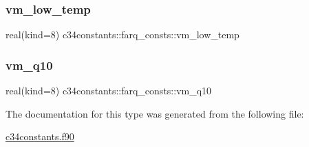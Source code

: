 \subsubsection{\texorpdfstring{vm\+\_\+low\+\_\+temp}{vm\_low\_temp}}
{\footnotesize\ttfamily real(kind=8) c34constants\+::farq\+\_\+consts\+::vm\+\_\+low\+\_\+temp}

\mbox{\label{structc34constants_1_1farq__consts_a6f62b2ef08a8e18c71f2af508abeb173}} 
\subsubsection{\texorpdfstring{vm\+\_\+q10}{vm\_q10}}
{\footnotesize\ttfamily real(kind=8) c34constants\+::farq\+\_\+consts\+::vm\+\_\+q10}



The documentation for this type was generated from the following file\+:\begin{DoxyCompactItemize}
\item 
\hyperlink{c34constants_8f90}{c34constants.\+f90}\end{DoxyCompactItemize}
